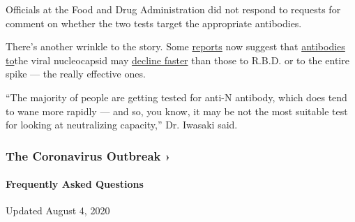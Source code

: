 Officials at the Food and Drug Administration did not respond to
requests for comment on whether the two tests target the appropriate
antibodies.

There's another wrinkle to the story. Some
\href{https://www.medrxiv.org/content/10.1101/2020.07.14.20153536v2?\%253fcollection=}{reports}
now suggest that
\href{https://www.nature.com/articles/s41591-020-0965-6}{antibodies
to}the viral nucleocapsid may
\href{https://www.medrxiv.org/content/10.1101/2020.07.16.20155663v2}{decline
faster} than those to R.B.D. or to the entire spike --- the really
effective ones.

``The majority of people are getting tested for anti-N antibody, which
does tend to wane more rapidly --- and so, you know, it may be not the
most suitable test for looking at neutralizing capacity,'' Dr. Iwasaki
said.

\href{https://www.nytimes.com/news-event/coronavirus?action=click\&pgtype=Article\&state=default\&region=MAIN_CONTENT_3\&context=storylines_faq}{}

\hypertarget{the-coronavirus-outbreak-}{%
\subsubsection{The Coronavirus Outbreak
›}\label{the-coronavirus-outbreak-}}

\hypertarget{frequently-asked-questions}{%
\paragraph{Frequently Asked
Questions}\label{frequently-asked-questions}}

Updated August 4, 2020

